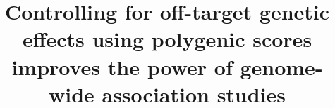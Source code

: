 \documentclass[doublespacing]{bmcart}
\begin{document}
\begin{frontmatter}

\begin{fmbox}


\title{Controlling for off-target genetic effects using polygenic scores improves the power of genome-wide association studies}

\author[
]{ }
\author[
]{ }
\author[
   addressref={aff1},                   %
   corref={aff1},                       %
   email={cathal.seoighe@nuigalway.ie}   %
]{ }






\address[id=aff1]{%
  , %
  ,                     %
  ,                              %
}


\end{fmbox}
\end{frontmatter}
\end{document}
